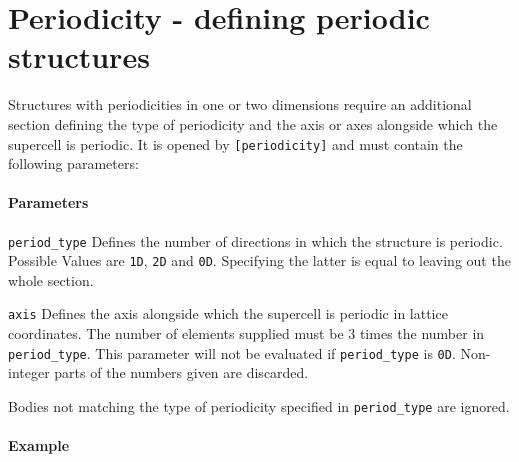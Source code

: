 \section{Periodicity - defining periodic structures}
Structures with periodicities in one or two dimensions require an additional section defining the type of periodicity and the axis or axes alongside which the supercell is periodic. It is opened by \lstinline{[periodicity]} and must contain the following parameters:

\paragraph{Parameters}

\begin{description}
 \item{\lstinline{period_type}} Defines the number of directions in which the structure is periodic. Possible Values are \lstinline{1D}, \lstinline{2D} and \lstinline{0D}. Specifying the latter is equal to leaving out the whole section.
 \item{\lstinline{axis}} Defines the axis alongside which the supercell is periodic in lattice coordinates. The number of elements supplied must be 3 times the number in \lstinline{period_type}. This parameter will not be evaluated if \lstinline{period_type} is \lstinline{0D}. Non-integer parts of the numbers given are discarded.
\end{description}

Bodies not matching the type of periodicity specified in \lstinline{period_type} are ignored.

\paragraph{Example}\ 


